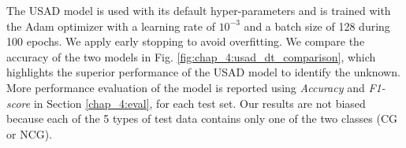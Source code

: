 The USAD model is used with its default hyper-parameters and is trained with the Adam optimizer with a learning rate of $10^{-3}$ and a batch size of 128 during 100 epochs. We apply early stopping to avoid overfitting. We compare the accuracy of the two models in Fig. \ref{fig:chap_4:usad_dt_comparison}, which highlights the superior performance of the USAD model to identify the unknown. More performance evaluation of the model is reported using \textit{Accuracy} and \textit{F1-score} in Section \ref{chap_4:eval}, for each test set. Our results are not biased because each of the 5 types of test data contains only one of the two classes (CG or NCG). 